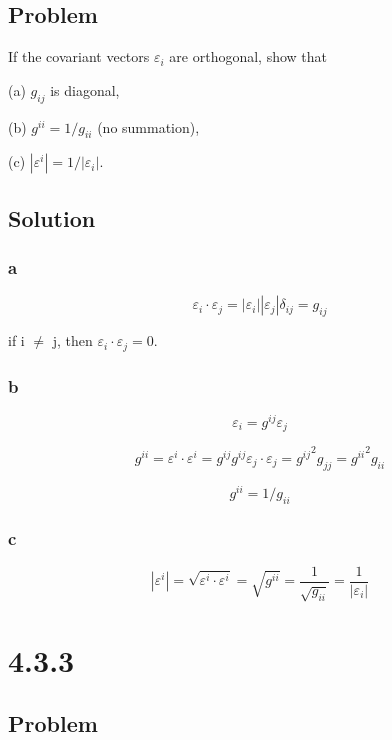 \documentclass[12pt]{article}
\begin{document}
\subsection{Problem}

If the covariant vectors \(\varepsilon_i\) are orthogonal, show that

(a) \(g_{ij}\) is diagonal,

(b) \(g^{ii} = 1/g_{ii}\) (no summation),

(c) \(|\varepsilon^i| = 1/|\varepsilon_i|\).

\subsection{Solution}

\subsubsection{a}

\[
    \varepsilon_i \cdot \varepsilon_j = |\varepsilon_i||\varepsilon_j|\delta_{ij} = g_{ij}
\]

if i \(\neq \) j, then \(\varepsilon_i \cdot \varepsilon_j = 0\).

\subsubsection{b}

\[
    \varepsilon_i = g^{ij}\varepsilon_j
\]

\[
    g^{ii} = \varepsilon^i \cdot \varepsilon^i
    = g^{ij} g^{ij} \varepsilon_j \cdot \varepsilon_j
    = {g^{ij}}^2 g_{jj}
    = {g^{ii}}^2 g_{ii}
\]

\[
    g^{ii} = 1/g_{ii}
\]

\subsubsection{c}

\[
    |\varepsilon^i| = \sqrt{\varepsilon^i \cdot \varepsilon^i}
    = \sqrt{{g^{ii}}}
    = \frac{1}{\sqrt{g_{ii}}}
    = \frac{1}{|\varepsilon_i|}
\]

\newpage
\section{4.3.3}

\subsection{Problem}
\end{document}
